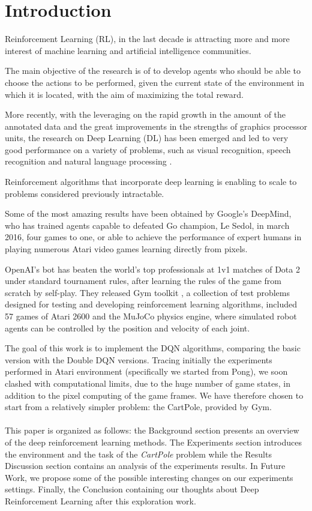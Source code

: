 \section{Introduction}

Reinforcement Learning (RL), in the last decade is attracting more and more interest of machine learning and artificial intelligence communities.

The main objective of the research is of to develop agents who should be able to choose the actions to be performed, given the current state of the environment in which it is located, with the aim of maximizing the total reward.

More recently, with the leveraging on the rapid growth in the amount of the annotated data and the great improvements in the strengths of graphics processor units, the research on  Deep Learning (DL) has been emerged and led to very good performance on a variety of problems, such as visual recognition, speech recognition and natural language processing \cite{AdvancesCNN}.

Reinforcement algorithms that incorporate deep learning is enabling to scale to problems considered previously intractable.

Some of the most amazing results have been obtained by Google’s DeepMind, who has trained agents capable to defeated Go champion, Le Sedol, in march 2016, four games to one, or able to achieve the performance of expert humans in playing numerous Atari video games learning directly from pixels.

OpenAI's bot has beaten the world's top professionals at 1v1 matches of Dota 2 under standard tournament rules, after learning the rules of the game from scratch by self-play.
They released Gym toolkit \cite{Gym}, a collection of test problems designed for testing and developing reinforcement learning algorithms, included 57 games of Atari 2600 and the MuJoCo physics engine, where simulated robot agents can be controlled by the position and velocity of each joint. 

The goal of this work is to implement the DQN algorithms, comparing the basic version with the Double DQN versions. Tracing initially the experiments performed in Atari environment (specifically we started from Pong), we soon clashed with computational limits, due to the huge number of game states, in addition to the pixel computing of the game frames. We have therefore chosen to start from a relatively simpler problem: the CartPole, provided by Gym.
\\\\
This paper is organized as follows: the Background section presents an overview of the deep reinforcement learning methods. The Experiments section introduces the environment and the task of the \textit{CartPole} problem while the Results Discussion section contains an analysis of the experiments results. In Future Work, we propose some of the possible interesting changes on our experiments settings. Finally, the Conclusion containing our thoughts about Deep Reinforcement Learning after this exploration work.
